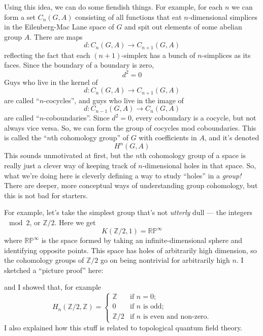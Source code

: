 \documentclass{article}
\def\tightlist{}
\renewcommand{\texttt}[1]{%
  \begingroup
  \ttfamily
  \begingroup\lccode`~=`/\lowercase{\endgroup\def~}{/\discretionary{}{}{}}%
  \begingroup\lccode`~=`[\lowercase{\endgroup\def~}{[\discretionary{}{}{}}%
  \begingroup\lccode`~=`.\lowercase{\endgroup\def~}{.\discretionary{}{}{}}%
  \catcode`/=\active\catcode`[=\active\catcode`.=\active
  \scantokens{#1\noexpand}%
  \endgroup
}
\begin{document}
Using this idea, we can do some fiendish things. For example, for each
\(n\) we can form a set \(C_n(G,A)\) consisting of all functions that
eat \(n\)-dimensional simplices in the Eilenberg-Mac Lane space of \(G\)
and spit out elements of some abelian group \(A\). There are maps
\[d\colon C_n(G,A) \to C_{n+1}(G,A)\] reflecting the fact that each
\((n+1)\)-simplex has a bunch of \(n\)-simplices as its faces. Since the
boundary of a boundary is zero, \[d^2 = 0\] Guys who live in the kernel
of \[d\colon C_n(G,A) \to C_{n+1}(G,A)\] are called ``\(n\)-cocycles'',
and guys who live in the image of \[d\colon C_{n-1}(G,A) \to C_n(G,A)\]
are called ``\(n\)-coboundaries''. Since \(d^2 = 0\), every coboundary
is a cocycle, but not always vice versa. So, we can form the group of
cocycles mod coboundaries. This is called the ``\(n\)th cohomology
group'' of \(G\) with coefficients in \(A\), and it's denoted
\[H^n(G,A)\] This sounds unmotivated at first, but the \(n\)th
cohomology group of a space is really just a clever way of keeping track
of \(n\)-dimensional holes in that space. So, what we're doing here is
cleverly defining a way to study ``holes'' in a \emph{group!} There are
deeper, more conceptual ways of understanding group cohomology, but this
is not bad for starters.

For example, let's take the simplest group that's not \emph{utterly}
dull --- the integers \(\mod 2\), or \(\mathbb{Z}/2\). Here we get
\[K(\mathbb{Z}/2,1) = \mathbb{RP}^\infty\] where \(\mathbb{RP}^\infty\)
is the space formed by taking an infinite-dimensional sphere and
identifying opposite points. This space has holes of arbitrarily high
dimension, so the cohomology groups of \(\mathbb{Z}/2\) go on being
nontrivial for arbitrarily high \(n\). I sketched a ``picture proof''
here:


and I showed that, for example \[
  H_n(\mathbb{Z}/2,\mathbb{Z}) =
  \begin{cases}
    \mathbb{Z} &\mbox{if $n=0$;}
  \\0 &\mbox{if $n$ is odd;}
  \\\mathbb{Z}/2 &\mbox{if $n$ is even and non-zero.}
  \end{cases}
\] I also explained how this stuff is related to topological quantum
field theory.
\end{document}
